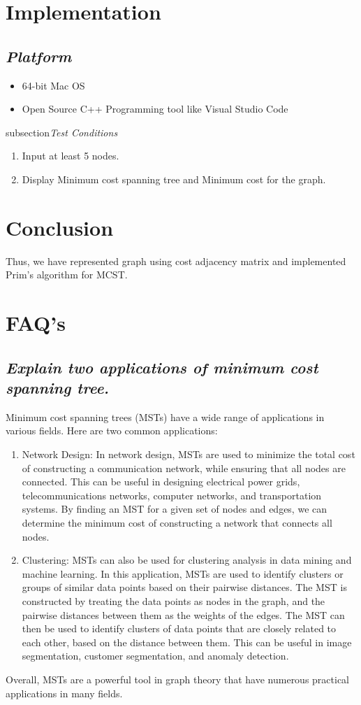 \documentclass{article}
\begin{document}
\section{\textbf{Implementation}}
\subsection{\textit{Platform}}
\begin{itemize}
	\item 64-bit Mac OS
	\item Open Source C++ Programming tool like Visual Studio Code
\end{itemize}
subsection{\textit{Test Conditions}}
\begin{enumerate}
    \item Input at least 5 nodes.
	\item Display Minimum cost spanning tree and Minimum cost for the graph.
\end{enumerate}
\section{\textbf{Conclusion}}
Thus, we have represented graph using cost adjacency matrix and implemented Prim’s algorithm for MCST.
\section{\textbf{FAQ's}}
\subsection{\textit{Explain two applications of minimum cost spanning tree.}}
Minimum cost spanning trees (MSTs) have a wide range of applications in various fields. Here are two common applications:
\begin{enumerate}
	\item Network Design: In network design, MSTs are used to minimize the total cost of constructing a communication network, while ensuring that all nodes are connected. This can be useful in designing electrical power grids, telecommunications networks, computer networks, and transportation systems. By finding an MST for a given set of nodes and edges, we can determine the minimum cost of constructing a network that connects all nodes.
	\item Clustering: MSTs can also be used for clustering analysis in data mining and machine learning. In this application, MSTs are used to identify clusters or groups of similar data points based on their pairwise distances. The MST is constructed by treating the data points as nodes in the graph, and the pairwise distances between them as the weights of the edges. The MST can then be used to identify clusters of data points that are closely related to each other, based on the distance between them. This can be useful in image segmentation, customer segmentation, and anomaly detection.
\end{enumerate}
Overall, MSTs are a powerful tool in graph theory that have numerous practical applications in many fields.
\end{document}
